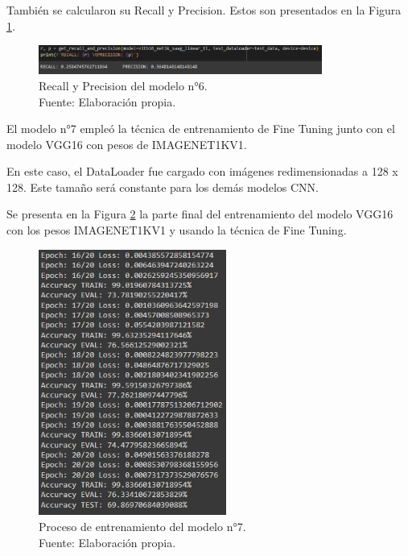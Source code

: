 También se calcularon su Recall y Precision. Estos son presentados en la Figura \ref{4:fig131}.

\begin{figure}[H]
	\begin{center}
		\includegraphics[width=0.83\textwidth]{4/figures/model6_rp.PNG}
		\caption[Recall y Precision del modelo n°6]{Recall y Precision del modelo n°6. \\
		Fuente: Elaboración propia.}
		\label{4:fig131}
	\end{center}
\end{figure}

El modelo n°7 empleó la técnica de entrenamiento de Fine Tuning junto con el modelo VGG16 con pesos de IMAGENET1KV1.

En este caso, el DataLoader fue cargado con imágenes redimensionadas a 128 x 128. Este tamaño será constante para los demás modelos CNN.

Se presenta en la Figura \ref{4:fig132} la parte final del entrenamiento del modelo VGG16 con los pesos IMAGENET1KV1 y usando la técnica de Fine Tuning.

\begin{figure}[H]
	\begin{center}
		\includegraphics[width=0.55\textwidth]{4/figures/model7_train.PNG}
		\caption[Proceso de entrenamiento del modelo n°7]{Proceso de entrenamiento del modelo n°7. \\
		Fuente: Elaboración propia.}
		\label{4:fig132}
	\end{center}
\end{figure}

